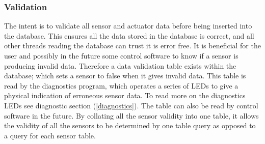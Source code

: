 \subsubsection{Validation}
The intent is to validate all sensor and actuator data before being inserted into the database. This ensures all the data stored in the database is correct, and all other threads reading the database can trust it is error free. 
\newline
It is beneficial for the user and possibly in the future some control software to know if a sensor is producing invalid data. Therefore a data validation table exists within the database; which sets a sensor to false when it gives invalid data. 
This table is read by the diagnostics program, which operates a series of LEDs to give a physical indication of erroneous sensor data. To read more on the diagnostics LEDs see diagnostic section (\ref{diagnostics}).
The table can also be read by control software in the future. By collating all the sensor validity into one table, it allows the validity of all the sensors to be determined by one table query as opposed to a query for each sensor table.


